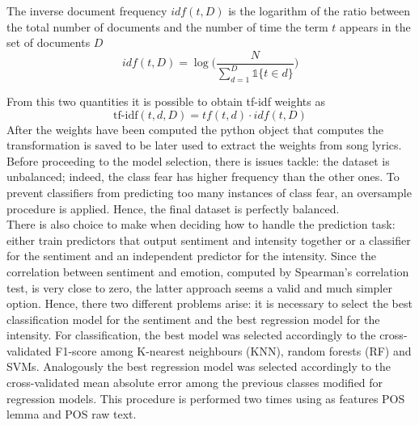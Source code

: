 \documentclass[runningheads]{llncs}
\begin{document}
The inverse document frequency $idf(t,D)$ is the logarithm of the ratio between the total number of documents and the number of time the term $t$ appears in the set of documents $D$
\begin{equation}
    idf(t,D) = \log \biggl ( \frac{N}{\sum_{d=1}^{D} \mathds{1}\{t \in d\}} \biggr )
\end{equation}

From this two quantities it is possible to obtain tf-idf weights as
\begin{equation}
    \text{tf-idf}(t,d,D) = tf(t,d) \cdot idf(t,D)
\end{equation}
After the weights have been computed the python object that computes the transformation is saved to be later used to extract the weights from song lyrics. \\

Before proceeding to the model selection, there is issues tackle: the dataset is unbalanced; indeed, the class fear has higher frequency than the other ones. To prevent classifiers from predicting too many instances of class fear, an oversample procedure is applied. Hence, the final dataset is perfectly balanced. \\
There is also choice to make when deciding how to handle the prediction task: either train predictors that output sentiment and intensity together or a  classifier for the sentiment and an independent predictor for the intensity. Since the correlation between sentiment and emotion, computed by Spearman's correlation test, is very close to zero, the latter approach seems a valid and much simpler option. Hence, there two different problems arise: it is necessary to select the best classification model for the sentiment and the best regression model for the intensity. For classification, the best model was selected accordingly to the cross-validated F1-score among K-nearest neighbours (KNN), random forests (RF) and SVMs. Analogously the best regression model was selected accordingly to the cross-validated mean absolute error among the previous classes modified for regression models. This procedure is performed two times using as features POS lemma and POS raw text. 
\end{document}
